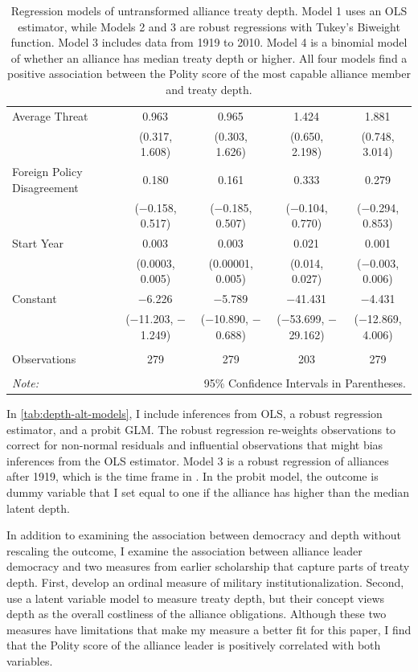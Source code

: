 \documentclass[12pt]{article}
\begin{document}
\begin{table}[!htbp]
\begin{adjustbox}{width= .95\textwidth, center}
\begin{tabular}{@{\extracolsep{5pt}}lcccc}
  Average Threat & 0.963$^{}$ & 0.965$^{}$ & 1.424$^{}$ & 1.881$^{}$ \\ 
  & (0.317, 1.608) & (0.303, 1.626) & (0.650, 2.198) & (0.748, 3.014) \\ 
  Foreign Policy Disagreement & 0.180 & 0.161 & 0.333 & 0.279 \\ 
  & ($-$0.158, 0.517) & ($-$0.185, 0.507) & ($-$0.104, 0.770) & ($-$0.294, 0.853) \\ 
  Start Year & 0.003$^{}$ & 0.003$^{}$ & 0.021$^{}$ & 0.001 \\ 
  & (0.0003, 0.005) & (0.00001, 0.005) & (0.014, 0.027) & ($-$0.003, 0.006) \\ 
  Constant & $-$6.226$^{}$ & $-$5.789$^{}$ & $-$41.431$^{}$ & $-$4.431 \\ 
  & ($-$11.203, $-$1.249) & ($-$10.890, $-$0.688) & ($-$53.699, $-$29.162) & ($-$12.869, 4.006) \\ 
 \hline \\[-1.8ex] 
Observations & 279 & 279 & 203 & 279 \\ 
\hline 
\hline \\[-1.8ex] 
\textit{Note:}  & \multicolumn{4}{r}{95\% Confidence Intervals in Parentheses.} \\ 
\end{tabular}
\end{adjustbox} 
  \caption{Regression models of untransformed alliance treaty depth. Model 1 uses an OLS estimator, while Models 2 and 3 are robust regressions with Tukey's Biweight function. Model 3 includes data from 1919 to 2010. Model 4 is a binomial model of whether an alliance has median treaty depth or higher. All four models find a positive association between the Polity score of the most capable alliance member and treaty depth.} 
  \label{tab:depth-alt-models} 
\end{table} 


In \autoref{tab:depth-alt-models}, I include inferences from OLS, a robust regression estimator, and a probit GLM. 
The robust regression re-weights observations to correct for non-normal residuals and influential observations that might bias inferences from the OLS estimator. 
Model 3 is a robust regression of alliances after 1919, which is the time frame in \citet{Mattes2012}. 
In the probit model, the outcome is dummy variable that I set equal to one if the alliance has higher than the median latent depth. 


In addition to examining the association between democracy and depth without rescaling the outcome, I examine the association between alliance leader democracy and two measures from earlier scholarship that capture parts of treaty depth. 
First, \citet{LeedsAnac2005} develop an ordinal measure of military institutionalization.
Second, \citet{BensonClinton2016} use a latent variable model to measure treaty depth, but their concept views depth as the overall costliness of the alliance obligations. 
Although these two measures have limitations that make my measure a better fit for this paper, I find that the Polity score of the alliance leader is positively correlated with both variables.
\end{document}
